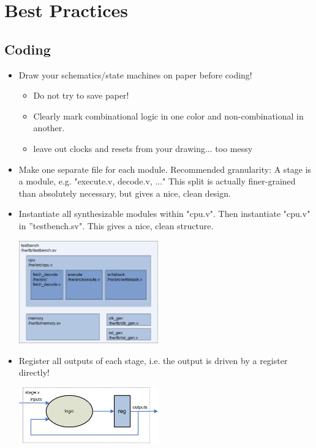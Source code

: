 \newpage

\section{Best Practices}



\subsection{Coding}
\begin{itemize}
	\item Draw your schematics/state machines on paper before coding!
	\begin{itemize}
		\item Do not try to save paper!
		\item Clearly mark combinational logic in one color and non-combinational in another. 
\item leave out clocks and resets from your drawing... too messy	
	\end{itemize}
	\item Make one separate file for each module. Recommended granularity: A stage is a module, e.g. "execute.v, decode.v, ..." This split is actually finer-grained than absolutely necessary, but gives a nice, clean design.\\
	\item Instantiate all synthesizable modules within "cpu.v". Then instantiate "cpu.v" in ''testbench.sv". This gives a nice, clean structure.
	\begin{center}
\includegraphics[width=6cm]{figs/block}
\end{center}
	\item Register all outputs of each stage, i.e. the output is driven by a register directly!
\begin{center}
\includegraphics[width=6cm]{figs/stage}

\end{center}
\end{itemize}
